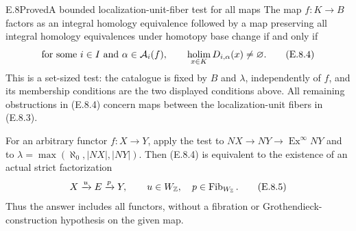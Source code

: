 \begin{claim}{E.8}{Proved}{A bounded localization-unit-fiber test for all maps}
The map $f:K\to B$ factors as an integral homology equivalence
followed by a map preserving all integral homology equivalences
under homotopy base change if and only if
\[
 \text{for some }i\in I\text{ and }\alpha\in\mathcal A_i(f),
       \qquad \operatorname*{holim}_{x\in K}D_{i,\alpha}(x)\ne\varnothing .
                                                               \tag{E.8.4}
\]
This is a set-sized test: the catalogue is fixed by $B$ and
$\lambda$, independently of $f$, and its membership conditions are
the two displayed conditions above. All remaining obstructions in
(E.8.4) concern maps between the localization-unit fibers in
(E.8.3).

For an arbitrary functor $f:X\to Y$, apply the test to
$NX\to NY\to\operatorname{Ex}^{\infty}NY$ and to
$\lambda=\max(\aleph_0,|NX|,|NY|)$. Then (E.8.4) is equivalent
to the existence of an actual strict factorization
\[
                X\xrightarrow{u}E\xrightarrow{p}Y,
                  \qquad u\in W_{\mathbb Z},\quad p\in\operatorname{Fib}_{W_{\mathbb Z}}.
                                                               \tag{E.8.5}
\]
Thus the answer includes all functors, without a fibration or
Grothendieck-construction hypothesis on the given map.
\end{claim}

